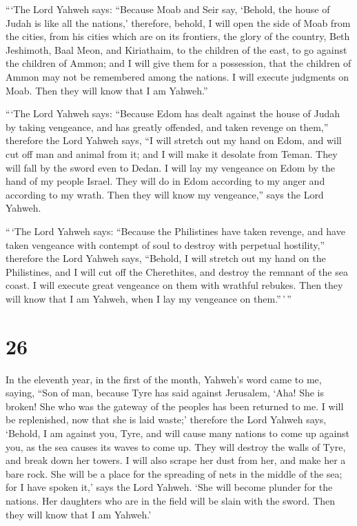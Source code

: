  ```The Lord Yahweh says: ``Because Moab and Seir say,
`Behold, the house of Judah is like all the nations,' 
therefore, behold, I will open the side of Moab from the cities, from
his cities which are on its frontiers, the glory of the country, Beth
Jeshimoth, Baal Meon, and Kiriathaim,  to the children of
the east, to go against the children of Ammon; and I will give them for
a possession, that the children of Ammon may not be remembered among the
nations.  I will execute judgments on Moab. Then they will
know that I am Yahweh.''

 ```The Lord Yahweh says: ``Because Edom has dealt against
the house of Judah by taking vengeance, and has greatly offended, and
taken revenge on them,''  therefore the Lord Yahweh says,
``I will stretch out my hand on Edom, and will cut off man and animal
from it; and I will make it desolate from Teman. They will fall by the
sword even to Dedan.  I will lay my vengeance on Edom by
the hand of my people Israel. They will do in Edom according to my anger
and according to my wrath. Then they will know my vengeance,'' says the
Lord Yahweh.

 ``\,`The Lord Yahweh says: ``Because the Philistines have
taken revenge, and have taken vengeance with contempt of soul to destroy
with perpetual hostility,''  therefore the Lord Yahweh
says, ``Behold, I will stretch out my hand on the Philistines, and I
will cut off the Cherethites, and destroy the remnant of the sea coast.
 I will execute great vengeance on them with wrathful
rebukes. Then they will know that I am Yahweh, when I lay my vengeance
on them.''\,'\,''

\hypertarget{section-24}{%
\section{26}\label{section-24}}

 In the eleventh year, in the first of the month, Yahweh's
word came to me, saying,  ``Son of man, because Tyre has
said against Jerusalem, `Aha! She is broken! She who was the gateway of
the peoples has been returned to me. I will be replenished, now that she
is laid waste;'  therefore the Lord Yahweh says, `Behold, I
am against you, Tyre, and will cause many nations to come up against
you, as the sea causes its waves to come up.  They will
destroy the walls of Tyre, and break down her towers. I will also scrape
her dust from her, and make her a bare rock.  She will be a
place for the spreading of nets in the middle of the sea; for I have
spoken it,' says the Lord Yahweh. `She will become plunder for the
nations.  Her daughters who are in the field will be slain
with the sword. Then they will know that I am Yahweh.'


